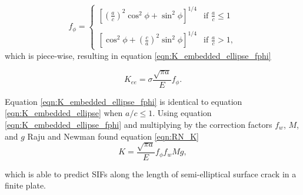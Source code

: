 \begin{equation} \label{eqn:fphi}
f_{\phi} = \begin{cases}
      \left[\left(\frac{a}{c}\right)^2 \cos^2\phi + \sin^2\phi\right]^{1/4} & \text{if } \frac{a}{c} \le 1 \\
      \\
      \left[\cos^2\phi + \left(\frac{c}{a}\right)^2\sin^2\phi\right]^{1/4} & \text{if } \frac{a}{c} > 1,
    \end{cases}
\end{equation}
 which is piece-wise, resulting in equation \ref{eqn:K_embedded_ellipse_fphi}

\begin{equation} \label{eqn:K_embedded_ellipse_fphi}
    K_{ee} = \sigma \frac{\sqrt{\pi a}}{E} f_{\phi}.
\end{equation}

Equation \ref{eqn:K_embedded_ellipse_fphi} is identical to equation \ref{eqn:K_embedded_ellipse} when $a/c \le 1$. Using equation \ref{eqn:K_embedded_ellipse_fphi} and multiplying by the correction factors $f_w$, $M$, and $g$ Raju and Newman found equation \ref{eqn:RN_K}
 \begin{equation} \label{eqn:RN_K}
     K = \frac{\sqrt{\pi a}}{E} f_{\phi} f_w M g,
 \end{equation} 

which is able to predict SIFs along the length of semi-elliptical surface crack in a finite plate.


